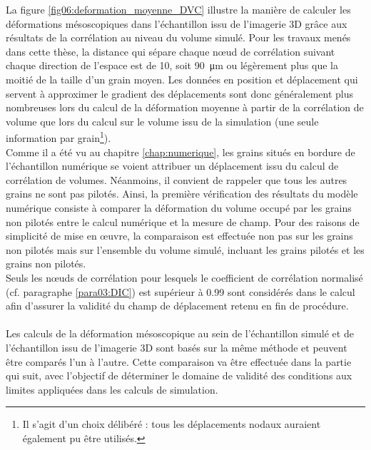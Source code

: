 		La figure \ref{fig06:deformation_moyenne_DVC} illustre la manière de calculer les déformations mésoscopiques dans l'échantillon issu de l'imagerie 3D grâce aux résultats de la corrélation au niveau du volume simulé. Pour les travaux menés dans cette thèse, la distance qui sépare chaque n\oe{}ud de corrélation suivant chaque direction de l'espace est de \SI{10}{\voxel}, soit \SI{90}{\micro\meter} ou légèrement plus que la moitié de la taille d'un grain moyen. Les données en position et déplacement qui servent à approximer le gradient des déplacements sont donc généralement plus nombreuses lors du calcul de la déformation moyenne à partir de la corrélation de volume que lors du calcul sur le volume issu de la simulation (une seule information par grain\footnote{Il s'agit d'un choix délibéré : tous les déplacements nodaux auraient également pu être utilisés.}).
		\\Comme il a été vu au chapitre \ref{chap:numerique}, les grains situés en bordure de l'échantillon numérique se voient attribuer un déplacement issu du calcul de corrélation de volumes. Néanmoins, il convient de rappeler que tous les autres grains ne sont pas pilotés. Ainsi, la première vérification des résultats du modèle numérique consiste à comparer la déformation du volume occupé par les grains non pilotés entre le calcul numérique et la mesure de champ. Pour des raisons de simplicité de mise en \oe{}uvre, la comparaison est effectuée non pas sur les grains non pilotés mais sur l'ensemble du volume simulé, incluant les grains pilotés et les grains non pilotés.
		\\Seuls les n\oe{}uds de corrélation pour lesquels le coefficient de corrélation normalisé (cf. paragraphe \ref{para03:DIC}) est supérieur à \num{0.99} sont considérés dans le calcul afin d'assurer la validité du champ de déplacement retenu en fin de procédure.
		\paragraph{}
		Les calculs de la déformation mésoscopique au sein de l'échantillon simulé et de l'échantillon issu de l'imagerie 3D sont basés sur la même méthode et peuvent être comparés l'un à l'autre. Cette comparaison va être effectuée dans la partie qui suit, avec l'objectif de déterminer le domaine de validité des conditions aux limites appliquées dans les calculs de simulation.
